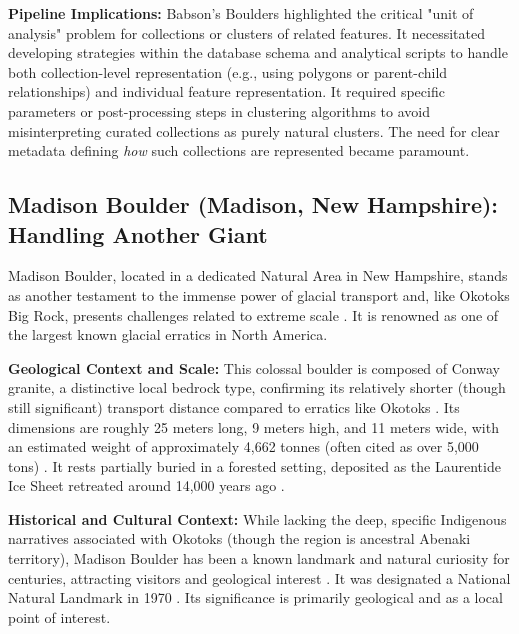 \textbf{Pipeline Implications:} Babson's Boulders highlighted the critical "unit of analysis" problem for collections or clusters of related features. It necessitated developing strategies within the database schema and analytical scripts to handle both collection-level representation (e.g., using polygons or parent-child relationships) and individual feature representation. It required specific parameters or post-processing steps in clustering algorithms to avoid misinterpreting curated collections as purely natural clusters. The need for clear metadata defining \emph{how} such collections are represented became paramount.

\subsection{Madison Boulder (Madison, New Hampshire): Handling Another Giant}
\label{subsec:madison}

Madison Boulder, located in a dedicated Natural Area in New Hampshire, stands as another testament to the immense power of glacial transport and, like Okotoks Big Rock, presents challenges related to extreme scale \cite{Goldthwait1925, NHMadisonBoulder}. It is renowned as one of the largest known glacial erratics in North America.

\textbf{Geological Context and Scale:} This colossal boulder is composed of Conway granite, a distinctive local bedrock type, confirming its relatively shorter (though still significant) transport distance compared to erratics like Okotoks \cite{Goldthwait1925, NPSMadisonBoulder}. Its dimensions are roughly 25 meters long, 9 meters high, and 11 meters wide, with an estimated weight of approximately 4,662 tonnes (often cited as over 5,000 tons) \cite{NHMadisonBoulder, NPSMadisonBoulder}. It rests partially buried in a forested setting, deposited as the Laurentide Ice Sheet retreated around 14,000 years ago \cite{Goldthwait1925}.

\textbf{Historical and Cultural Context:} While lacking the deep, specific Indigenous narratives associated with Okotoks (though the region is ancestral Abenaki territory), Madison Boulder has been a known landmark and natural curiosity for centuries, attracting visitors and geological interest \cite{NHMadisonBoulder}. It was designated a National Natural Landmark in 1970 \cite{NPSMadisonBoulder}. Its significance is primarily geological and as a local point of interest.

